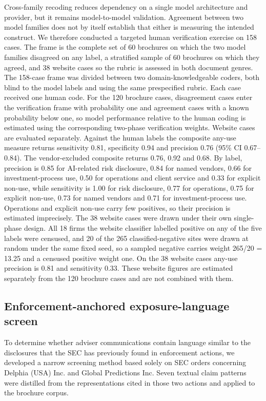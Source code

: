 \documentclass[utf8]{FrontiersinHarvard}
\begin{document}
Cross-family recoding reduces dependency on a single model architecture and provider, but it remains model-to-model validation. Agreement between two model families does not by itself establish that either is measuring the intended construct. We therefore conducted a targeted human verification exercise on 158 cases. The frame is the complete set of 60 brochures on which the two model families disagreed on any label, a stratified sample of 60 brochures on which they agreed, and 38 website cases so the rubric is assessed in both document genres. The 158-case frame was divided between two domain-knowledgeable coders, both blind to the model labels and using the same prespecified rubric. Each case received one human code. For the 120 brochure cases, disagreement cases enter the verification frame with probability one and agreement cases with a known probability below one, so model performance relative to the human coding is estimated using the corresponding two-phase verification weights. Website cases are evaluated separately. Against the human labels the composite any-use measure returns sensitivity 0.81, specificity 0.94 and precision 0.76 (95\% CI 0.67--0.84). The vendor-excluded composite returns 0.76, 0.92 and 0.68. By label, precision is 0.85 for AI-related risk disclosure, 0.84 for named vendors, 0.66 for investment-process use, 0.50 for operations and client service and 0.33 for explicit non-use, while sensitivity is 1.00 for risk disclosure, 0.77 for operations, 0.75 for explicit non-use, 0.73 for named vendors and 0.71 for investment-process use. Operations and explicit non-use carry few positives, so their precision is estimated imprecisely. The 38 website cases were drawn under their own single-phase design. All 18 firms the website classifier labelled positive on any of the five labels were censused, and 20 of the 265 classified-negative sites were drawn at random under the same fixed seed, so a sampled negative carries weight 265/20 = 13.25 and a censused positive weight one. On the 38 website cases any-use precision is 0.81 and sensitivity 0.33. These website figures are estimated separately from the 120 brochure cases and are not combined with them.

\subsection{Enforcement-anchored exposure-language screen}

To determine whether adviser communications contain language similar to the disclosures that the SEC has previously found in enforcement actions, we developed a narrow screening method based solely on SEC orders concerning Delphia (USA) Inc. and Global Predictions Inc. Seven textual claim patterns were distilled from the representations cited in those two actions and applied to the brochure corpus.
\end{document}
